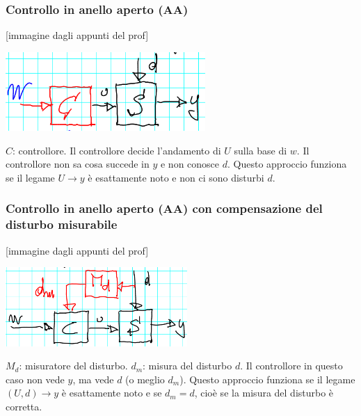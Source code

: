 \subsubsection{Controllo in anello aperto (AA)}
[immagine dagli appunti del prof]
\begin{center}
    \includegraphics[height=3cm]{../lezione1/img2.PNG}
\end{center}
$C$: controllore.\newline
Il controllore decide l'andamento di $U$ sulla base di $w$. Il controllore non sa cosa succede in $y$ e non conosce $d$.\newline
Questo approccio funziona se il legame $U \rightarrow y$ è esattamente noto e non ci sono disturbi $d$.\newline
\subsubsection{Controllo in anello aperto (AA) con compensazione del disturbo misurabile}
[immagine dagli appunti del prof]
\begin{center}
    \includegraphics[height=3cm]{../lezione1/img3.PNG}
\end{center}
$M_d$: misuratore del disturbo.\newline
$d_m$: misura del disturbo $d$.\newline
Il controllore in questo caso non vede $y$, ma vede $d$ (o meglio $d_m$).\newline
Questo approccio funziona se il legame $(U,d) \rightarrow y$ è esattamente noto e se $d_m = d$, cioè se la misura del disturbo è corretta.
